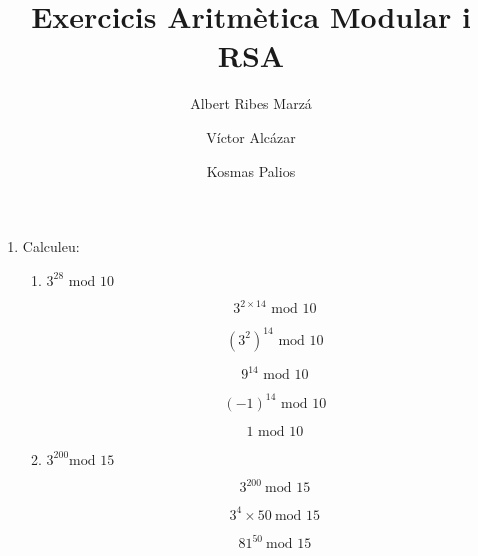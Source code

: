 \documentclass[a4paper,10pt]{article}
\title{Exercicis Aritmètica Modular i RSA}
\author{
Albert Ribes Marzá
\and
Víctor Alcázar
\and
Kosmas Palios
}
\begin{document}
\maketitle

\begin{abstract}

\end{abstract}

\begin{enumerate}
 \item Calculeu:
 \begin{enumerate}
  \item $3^{28} \textrm{ mod } 10$
  
  \begin{equation}
   3^{2 \times 14} \textrm{ mod } 10
  \end{equation}
  
  \begin{equation}
   (3^2)^{14} \textrm{ mod } 10
  \end{equation}
  
  \begin{equation}
   9^{14} \textrm{ mod } 10
  \end{equation}
  
  \begin{equation}
   (-1)^{14} \textrm{ mod } 10
  \end{equation}
  
  \begin{equation}
   1 \textrm{ mod } 10
  \end{equation}
  
 

  
  
  \item $3^{200} \textrm {mod } 15$
  
    
  \begin{equation}
  3^{200}\ \textrm{mod } 15
  \end{equation}
  
    \begin{equation}
  3^4 \times 50\ \textrm{mod } 15
  \end{equation}
  
      \begin{equation}
  81^{50}\ \textrm{mod } 15
  \end{equation}
  

\end{enumerate}
\end{enumerate}
\end{document}
